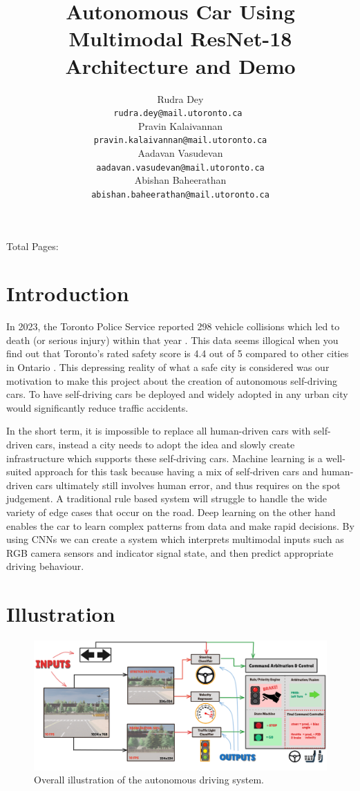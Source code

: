 \documentclass{article} %
\title{Autonomous Car Using Multimodal ResNet-18 Architecture and Demo}
\author{Rudra Dey  \\
\texttt{rudra.dey@mail.utoronto.ca } \\
\And
Pravin Kalaivannan  \\
\texttt{pravin.kalaivannan@mail.utoronto.ca} \\
\AND
Aadavan Vasudevan  \\
\texttt{aadavan.vasudevan@mail.utoronto.ca} \\
\And
Abishan Baheerathan \\
\texttt{abishan.baheerathan@mail.utoronto.ca} \\
\AND
}
\begin{document}
\maketitle

Total Pages: \pageref{last_page}


\section{Introduction}

In 2023, the Toronto Police Service reported 298 vehicle collisions which led to death (or serious injury) within that year \citep{toronto-ksi}. This data seems illogical when
you find out that Toronto’s rated safety score is 4.4 out of 5 compared to other cities in Ontario \citep{brokerlink2025ontario}.
This depressing reality of what a safe city is considered was our motivation to make this project about the creation of autonomous self-driving cars. To have self-driving cars be deployed and widely adopted in any urban city would significantly reduce traffic accidents.

In the short term, it is impossible to replace all human-driven cars with self-driven cars, instead a city needs to adopt the idea and slowly
create infrastructure which supports these self-driving cars. Machine learning is a well-suited approach for this task because having a mix of
self-driven cars and human-driven cars ultimately still involves human error, and thus requires on the spot judgement. A traditional rule based
system will struggle to handle the wide variety of edge cases that occur on the road. Deep learning on the other hand enables the car to learn
complex patterns from data and make rapid decisions. By using CNNs we can create a system which interprets multimodal inputs such as RGB camera
sensors and indicator signal state, and then predict appropriate driving behaviour.

\section{Illustration}


\begin{figure}[H] %
    \centering
    \includegraphics[width=1.0\textwidth]{newPic.png} %
    \caption{Overall illustration of the autonomous driving system.}
    \label{fig:illustrationExample}
\end{figure}
\end{document}
